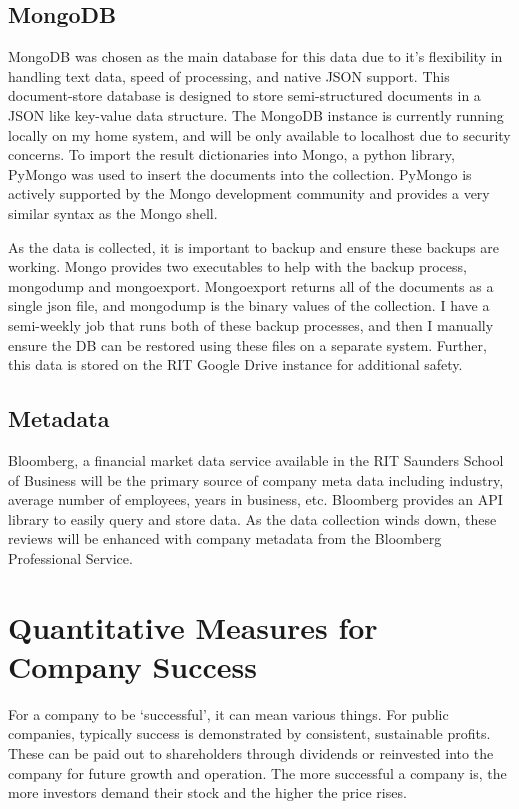 \documentclass[conference, letterpaper]{IEEEtran}
\begin{document}
\subsection{MongoDB}

MongoDB was chosen as the main database for this data due to it's flexibility in handling text data, speed of processing, and native JSON support.  
This document-store database is designed to store semi-structured documents in a JSON like key-value data structure.  
The MongoDB instance is currently running locally on my home system, and will be only available to localhost due to security concerns.  
To import the result dictionaries into Mongo, a python library, PyMongo was used to insert the documents into the collection. 
PyMongo is actively supported by the Mongo development community and provides a very similar syntax as the Mongo shell.

As the data is collected, it is important to backup and ensure these backups are working.  
Mongo provides two executables to help with the backup process, mongodump and mongoexport.
Mongoexport returns all of the documents as a single json file, and mongodump is the binary values of the collection.
I have a semi-weekly job that runs both of these backup processes, and then I manually ensure the DB can be restored using these files on a separate system. 
Further, this data is stored on the RIT Google Drive instance for additional safety.

\subsection{Metadata}
Bloomberg, a financial market data service available in the RIT Saunders School of Business will be the primary source of company meta data including industry, average number of employees, years in business, etc.
Bloomberg provides an API library to easily query and store data.
As the data collection winds down, these reviews will be enhanced with company metadata from the Bloomberg Professional Service.

	
\section{Quantitative Measures for Company Success}
For a company to be `successful', it can mean various things.
For public companies, typically success is demonstrated by consistent, sustainable profits.
These can be paid out to shareholders through dividends or reinvested into the company for future growth and operation.
The more successful a company is, the more investors demand their stock and the higher the price rises.
\end{document}
